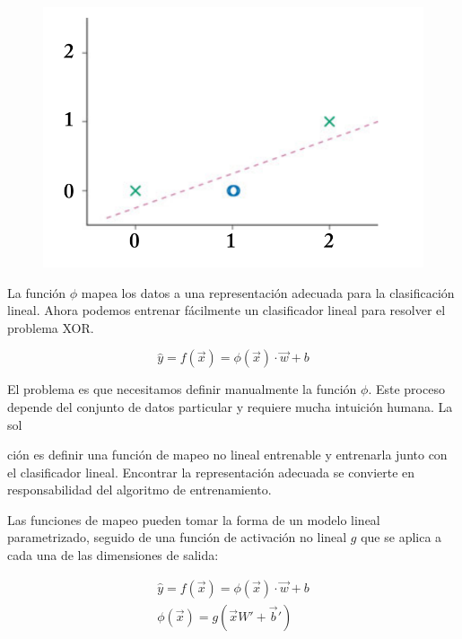 \begin{figure}[htb]
	\centering
	 \includegraphics[scale=0.25]{pics/xor2.png}
\end{figure}

La función $\phi$ mapea los datos a una representación adecuada para la clasificación lineal. Ahora podemos entrenar fácilmente un clasificador lineal para resolver el problema XOR.

\begin{equation}
\hat{y} = f(\vec{x}) = \phi(\vec{x}) \cdot \vec{w} + b
\end{equation}

El problema es que necesitamos definir manualmente la función $\phi$. Este proceso depende del conjunto de datos particular y requiere mucha intuición humana. La sol

ción es definir una función de mapeo no lineal entrenable y entrenarla junto con el clasificador lineal. Encontrar la representación adecuada se convierte en responsabilidad del algoritmo de entrenamiento.

Las funciones de mapeo pueden tomar la forma de un modelo lineal parametrizado, seguido de una función de activación no lineal $g$ que se aplica a cada una de las dimensiones de salida:

\begin{equation}
\begin{split}
\hat{y} = f(\vec{x}) = \phi(\vec{x}) \cdot \vec{w} + b \\
\phi(\vec{x}) = g(\vec{x}W' + \vec{b}') \\
\end{split}
\end{equation}

